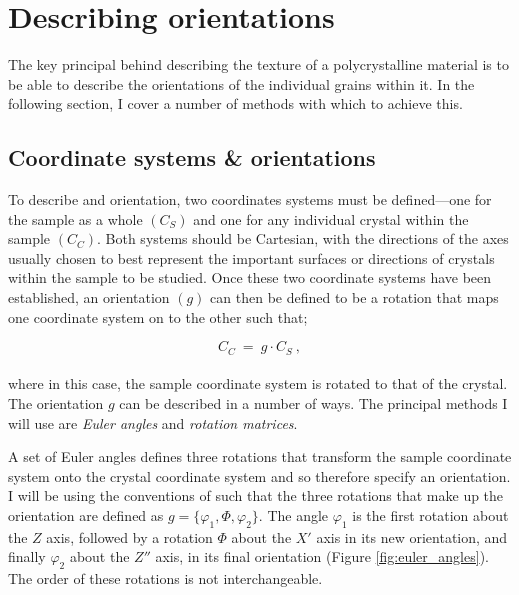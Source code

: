 \documentclass[a4paper,12pt,twoside]{report}
\numberwithin{equation}{chapter}
\begin{document}
\section{Describing orientations} \label{sec:orientations}
The key principal behind describing the texture of a polycrystalline material is to be able to describe the orientations of the individual grains within it. In the following section, I cover a number of methods with which to achieve this.




\subsection{Coordinate systems \& orientations} \label{subsec:coordinates}
To describe and orientation, two coordinates systems must be defined---one for the sample as a whole $(C_S)$ and one for any individual crystal within the sample $(C_C)$. Both systems should be Cartesian, with the directions of the axes usually chosen to best represent the important surfaces or directions of crystals within the sample to be studied. Once these two coordinate systems have been established, an orientation $(g)$ can then be defined to be a rotation that maps one coordinate system on to the other such that;



\begin{equation}
C_C\ =\ g \cdot C_S\ ,
\end{equation}  
\\
where in this case, the sample coordinate system is rotated to that of the crystal. The orientation $g$ can be described in a number of ways. The principal methods I will use are \emph{Euler angles} and \emph{rotation matrices}.


A set of Euler angles defines three rotations that transform the sample coordinate system onto the crystal coordinate system and so therefore specify an orientation. I will be using the conventions of \cite{bunge1982texture} such that the three rotations that make up the orientation are defined as $g = \{\varphi_1,\Phi,\varphi_2\}$. The angle $\varphi_1$ is the first rotation about the $Z$ axis, followed by a rotation $\Phi$ about the $X'$ axis in its new orientation, and finally $\varphi_2$ about the $Z''$ axis, in its final orientation (Figure \ref{fig:euler_angles}). The order of these rotations is not interchangeable.
\end{document}
